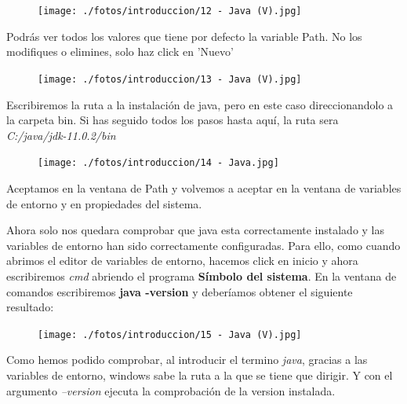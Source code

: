 \documentclass[a4paper,10pt]{article}
\begin{document}
\begin{figure}[H]
\begin{center}
\texttt{[image: ./fotos/introduccion/12 - Java (V).jpg]}
\end{center}
\end{figure}

\clearpage

Podrás ver todos los valores que tiene por defecto la variable Path. No los modifiques o elimines, solo haz click en 'Nuevo' 

\begin{figure}[H]
\begin{center}
\texttt{[image: ./fotos/introduccion/13 - Java (V).jpg]}
\end{center}
\end{figure}

Escribiremos la ruta a la instalación de java, pero en este caso direccionandolo a la carpeta bin. Si has seguido todos los pasos hasta aquí, la ruta sera \textit{C:/java/jdk-11.0.2/bin}

\begin{figure}[H]
\begin{center}
\texttt{[image: ./fotos/introduccion/14 - Java.jpg]}
\end{center}
\end{figure}

Aceptamos en la ventana de Path y volvemos a aceptar en la ventana de variables de entorno y en propiedades del sistema.

\clearpage

Ahora solo nos quedara comprobar que java esta correctamente instalado y las variables de entorno han sido correctamente configuradas. Para ello, como cuando abrimos el editor de variables de entorno, hacemos click en inicio y ahora escribiremos \textit{cmd} abriendo el programa \textbf{Símbolo del sistema}. En la ventana de comandos escribiremos \textbf{java -version} y deberíamos obtener el siguiente resultado:

\begin{figure}[H]
\begin{center}
\texttt{[image: ./fotos/introduccion/15 - Java (V).jpg]}
\end{center}
\end{figure}

Como hemos podido comprobar, al introducir el termino \textit{java}, gracias a las variables de entorno, windows sabe la ruta a la que se tiene que dirigir. Y con el argumento \textit{--version} ejecuta la comprobación de la version instalada.
\end{document}
